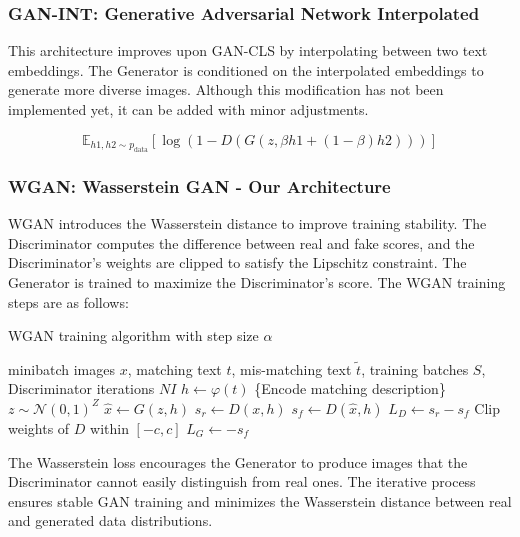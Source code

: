 \subsubsection*{GAN-INT: Generative Adversarial Network Interpolated}
This architecture improves upon GAN-CLS by interpolating between two text embeddings. 
The Generator is conditioned on the interpolated embeddings to generate more diverse images. 
Although this modification has not been implemented yet, it can be added with minor adjustments.

\[
\mathbb{E}_{h1,h2 \sim p_{\text{data}} } [\log( 1 - D(G( z , \beta h1 + (1-\beta) h2 )))]
\]

\subsubsection*{WGAN: Wasserstein GAN - Our Architecture}
WGAN introduces the Wasserstein distance to improve training stability. 
The Discriminator computes the difference between real and fake scores, 
and the Discriminator's weights are clipped to satisfy the Lipschitz constraint. 
The Generator is trained to maximize the Discriminator's score. 
The WGAN training steps are as follows:
\begin{algorithm}
    \caption{WGAN training algorithm with step size $\alpha$}
    \begin{algorithmic}
        \Require minibatch images $x$, matching text $t$, mis-matching text $\tilde{t}$, training batches $S$, Discriminator iterations $NI$
            \State $h \leftarrow \varphi(t)$ \hfill \{Encode matching description\}
                \State $z \sim \mathcal{N}(0, 1)^Z$
                \State $\hat{x} \leftarrow G(z, h)$
                \State $s_r \leftarrow D(x, h)$
                \State $s_f \leftarrow D(\hat{x}, h)$
                \State $L_D \leftarrow s_r - s_f$
                \State Clip weights of $D$ within $[-c, c]$
            \EndFor
            \State $L_G \leftarrow -s_f$
        \EndFor
    \end{algorithmic}
\end{algorithm}
\newpage
The Wasserstein loss encourages the Generator to produce images 
that the Discriminator cannot easily distinguish from real ones. 
The iterative process ensures stable GAN training and minimizes 
the Wasserstein distance between real and generated data distributions.


